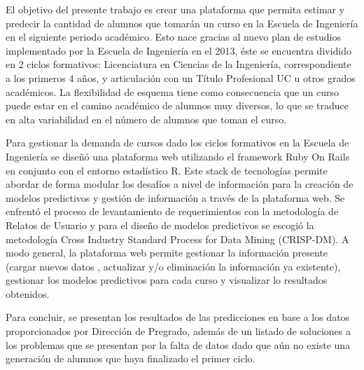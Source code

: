 El objetivo del presente trabajo es crear una  plataforma  que permita estimar y predecir la cantidad de alumnos que tomarán un curso en la Escuela de Ingeniería en el siguiente periodo
académico. Esto nace gracias al nuevo plan de estudios implementado por la Escuela  de Ingeniería en el 2013, éste se encuentra dividido en 2 ciclos formativos:
Licenciatura en Ciencias de la Ingeniería, correspondiente a los primeros 4 años, y articulación con un Título Profesional UC u otros grados académicos.
La flexibilidad de esquema tiene como consecuencia que un curso puede estar en el camino académico de alumnos muy diversos, lo que se traduce en alta variabilidad en el número de alumnos
que toman el curso.

Para gestionar la demanda de cursos dado los ciclos formativos en la Escuela de Ingeniería se diseñó una plataforma web utilizando el framework Ruby On Rails en conjunto con el entorno
estadístico R. Este stack de tecnologías permite abordar de forma modular los desafíos a nivel de información para la creación de modelos predictivos y gestión de información a través de
la plataforma web. Se enfrentó el proceso de levantamiento de requerimientos con la metodología de Relatos de Usuario y para el diseño de modelos predictivos se escogió la metodología
Cross Industry Standard Process for Data Mining (CRISP-DM). A modo general, la plataforma web permite gestionar la información presente (cargar nuevos datos , actualizar y/o eliminación
la información ya existente), gestionar los modelos predictivos para cada curso y visualizar lo resultados obtenidos.

Para concluir, se presentan los resultados de las predicciones en base a los datos proporcionados por Dirección de Pregrado, además de un listado de soluciones a los problemas que se
presentan por la falta de datos dado que aún no existe una generación de alumnos que haya finalizado el primer ciclo.

